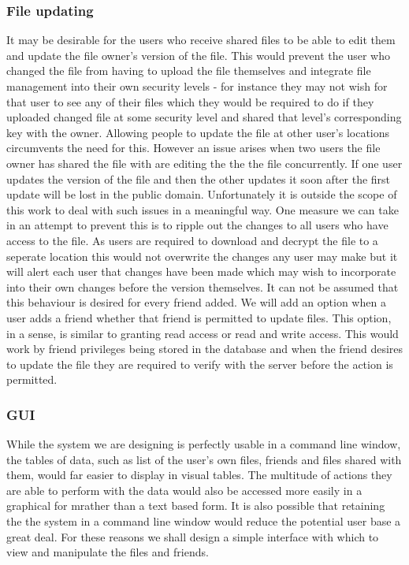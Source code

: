 \documentclass[12pt, titlepage]{article}
\begin{document}
\subsubsection{File updating}
It may be desirable for the users who receive shared files to be able to edit them and update the file owner's version of the file. This would prevent the user who changed the file from having to upload the file themselves and integrate file management into their own security levels - for instance they may not wish for that user to see any of their files which they would be required to do if they uploaded changed file at some security level and shared that level's corresponding key with the owner. Allowing people to update the file at other user's locations circumvents the need for this.
\newline \indent However an issue arises when two users the file owner has shared the file with are editing the the the file concurrently. If one user updates the version of the file and then the other updates it soon after the first update will be lost in the public domain. Unfortunately it is outside the scope of this work to deal with such issues in a meaningful way. One measure we can take in an attempt to prevent this is to ripple out the changes to all users who have access to the file. As users are required to download and decrypt the file to a seperate location this would not overwrite the changes any user may make but it will alert each user that changes have been made which may wish to incorporate into their own changes before the version themselves.
\newline \indent It can not be assumed that this behaviour is desired for every friend added. We will add an option when a user adds a friend whether that friend is permitted to update files. This option, in a sense, is similar to granting read access or read and write access. This would work by friend privileges being stored in the database and when the friend desires to update the file they are required to verify with the server before the action is permitted.

\subsubsection{GUI}
While the system we are designing is perfectly usable in a command line window, the tables of data, such as list of the user's own files, friends and files shared with them, would far easier to display in visual tables. The multitude of actions they are able to perform with the data would also be accessed more easily in a graphical for mrather than a text based form. It is also possible that retaining the the system in a command line window would reduce the potential user base a great deal. For these reasons we shall design a simple interface with which to view and manipulate the files and friends.
\end{document}
